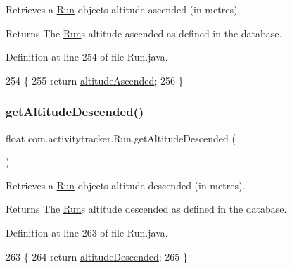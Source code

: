 Retrieves a \mbox{\hyperlink{classcom_1_1activitytracker_1_1_run}{Run}} object\textquotesingle{}s altitude ascended (in metres).

\begin{DoxyReturn}{Returns}
The \mbox{\hyperlink{classcom_1_1activitytracker_1_1_run}{Run}}\textquotesingle{}s altitude ascended as defined in the database. 
\end{DoxyReturn}


Definition at line 254 of file Run.\+java.


\begin{DoxyCode}
254                                        \{
255         \textcolor{keywordflow}{return} \mbox{\hyperlink{classcom_1_1activitytracker_1_1_run_ad28bf8d709b4cfcdb93a51033a90728c}{altitudeAscended}};
256     \}
\end{DoxyCode}
\mbox{\label{classcom_1_1activitytracker_1_1_run_a75d18e68f984a4f5481e25f2c70f0492}} 
\subsubsection{\texorpdfstring{get\+Altitude\+Descended()}{getAltitudeDescended()}}
{\footnotesize\ttfamily float com.\+activitytracker.\+Run.\+get\+Altitude\+Descended (\begin{DoxyParamCaption}{ }\end{DoxyParamCaption})}

Retrieves a \mbox{\hyperlink{classcom_1_1activitytracker_1_1_run}{Run}} object\textquotesingle{}s altitude descended (in metres).

\begin{DoxyReturn}{Returns}
The \mbox{\hyperlink{classcom_1_1activitytracker_1_1_run}{Run}}\textquotesingle{}s altitude descended as defined in the database. 
\end{DoxyReturn}


Definition at line 263 of file Run.\+java.


\begin{DoxyCode}
263                                         \{
264         \textcolor{keywordflow}{return} \mbox{\hyperlink{classcom_1_1activitytracker_1_1_run_a4997349f78c9147a30811306c2ab5223}{altitudeDescended}};
265     \}
\end{DoxyCode}
\mbox{\label{classcom_1_1activitytracker_1_1_run_a2d3b805547023d02f99634e09c6fa086}} 
